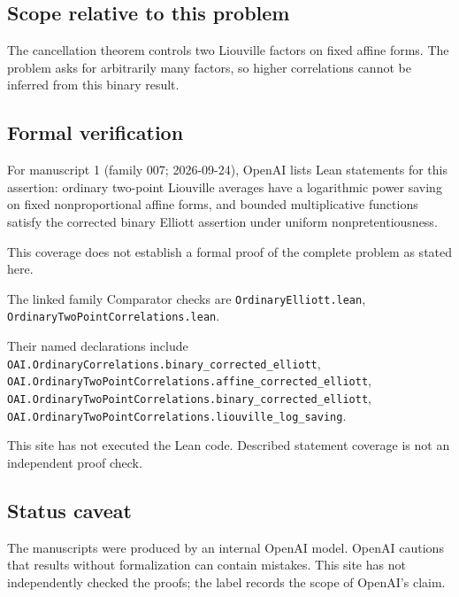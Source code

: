 \documentclass[11pt]{article}
\begin{document}
\subsection{Scope relative to this problem}
The cancellation theorem controls two Liouville factors on fixed affine forms. The problem asks for arbitrarily many factors, so higher correlations cannot be inferred from this binary result.

\subsection{Formal verification}
For manuscript 1 (family 007; 2026-09-24), OpenAI lists Lean statements for this assertion: ordinary two-point Liouville averages have a logarithmic power saving on fixed nonproportional affine forms, and bounded multiplicative functions satisfy the corrected binary Elliott assertion under uniform nonpretentiousness.

This coverage does not establish a formal proof of the complete problem as stated here.

The linked family Comparator checks are \texttt{OrdinaryElliott.lean}, \texttt{OrdinaryTwoPointCorrelations.lean}.

Their named declarations include \texttt{OAI.OrdinaryCorrelations.binary\_corrected\_elliott}, \texttt{OAI.OrdinaryTwoPointCorrelations.affine\_corrected\_elliott}, \texttt{OAI.OrdinaryTwoPointCorrelations.binary\_corrected\_elliott}, \texttt{OAI.OrdinaryTwoPointCorrelations.liouville\_log\_saving}.

This site has not executed the Lean code. Described statement coverage is not an independent proof check.

\subsection{Status caveat}
The manuscripts were produced by an internal OpenAI model. OpenAI cautions that results without formalization can contain mistakes. This site has not independently checked the proofs; the label records the scope of OpenAI's claim.
\end{document}
